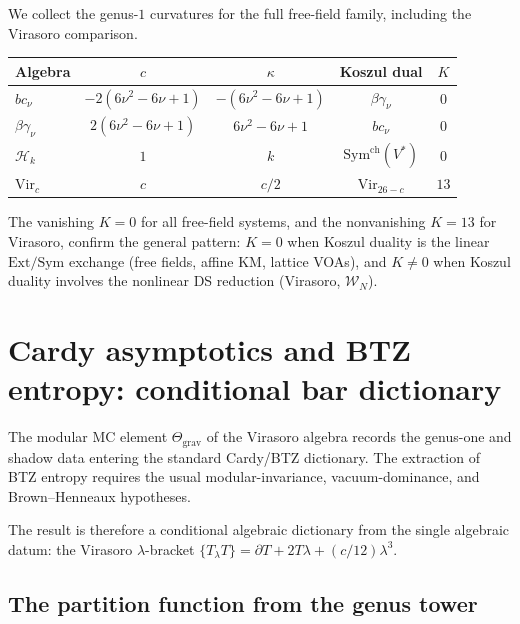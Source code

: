 \documentclass[11pt]{article}
\newcommand{\cW}{\mathcal{W}}
\newcommand{\cH}{\mathcal{H}}
\begin{document}
We collect the genus-$1$ curvatures for the full free-field
family, including the Virasoro comparison.

\begin{center}
\renewcommand{\arraystretch}{1.3}
\begin{tabular}{lcccc}
\hline
Algebra & $c$ & $\kappa$ & Koszul dual & $K$ \\
\hline
$bc_\nu$ & $-2(6\nu^2 - 6\nu + 1)$
  & $-(6\nu^2 - 6\nu + 1)$
  & $\beta\gamma_\nu$ & $0$ \\[3pt]
$\beta\gamma_\nu$ & $2(6\nu^2 - 6\nu + 1)$
  & $6\nu^2 - 6\nu + 1$
  & $bc_\nu$ & $0$ \\[3pt]
$\cH_k$ & $1$ & $k$ & $\mathrm{Sym}^{\mathrm{ch}}(V^*)$ & $0$ \\[3pt]
$\mathrm{Vir}_c$ & $c$ & $c/2$ & $\mathrm{Vir}_{26-c}$ & $13$ \\
\hline
\end{tabular}
\end{center}
The vanishing $K = 0$ for all free-field systems, and the
nonvanishing $K = 13$ for Virasoro, confirm the general pattern:
$K = 0$ when Koszul duality is the linear
$\mathrm{Ext}/\mathrm{Sym}$ exchange (free fields, affine
KM, lattice VOAs), and $K \neq 0$ when Koszul duality involves
the nonlinear DS reduction (Virasoro, $\cW_N$).


\section{Cardy asymptotics and BTZ entropy: conditional bar dictionary}
\label{sec:btz-entropy-cardy}

The modular MC element $\Theta_{\mathrm{grav}}$ of the Virasoro
algebra records the genus-one and shadow data entering the
standard Cardy/BTZ dictionary.  The extraction of BTZ entropy
requires the usual modular-invariance, vacuum-dominance, and
Brown--Henneaux hypotheses.

The result is therefore a conditional algebraic dictionary from
the single algebraic datum: the Virasoro $\lambda$-bracket
$\{T_\lambda T\} = \partial T + 2T\lambda + (c/12)\lambda^3$.

\subsection{The partition function from the genus tower}
\label{subsec:btz-partition}
\end{document}
